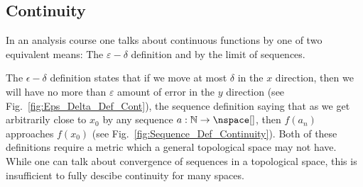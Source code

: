 \documentclass{book}                                                           %
\begin{document}
            \subsection{Continuity}
                In an analysis course one talks about continuous functions by
                one of two equivalent means: The $\varepsilon-\delta$ definition
                and by the limit of sequences.
                \par\hfill\par
                \begin{minipage}[t]{0.50\textwidth}
                    The $\epsilon-\delta$ definition states that if we move at
                    most $\delta$ in the $x$ direction, then we will have no
                    more than $\varepsilon$ amount of error in the $y$
                    direction (see Fig.~\ref{fig:Eps_Delta_Def_Cont}), the
                    sequence definition saying that as we get arbitrarily close
                    to $x_{0}$ by any sequence
                    $a:\mathbb{N}\rightarrow\nspace[]$, then $f(a_{n})$
                    approaches $f(x_{0})$
                    (see Fig.~\ref{fig:Sequence_Def_Continuity}). Both of these
                    definitions require a metric which a general topological
                    space may not have. While one can talk about convergence of
                    sequences in a topological space, this is insufficient to
                    fully descibe continuity for many spaces.
                \end{minipage}
                \hfill
                \par\hfill\par
\end{document}

